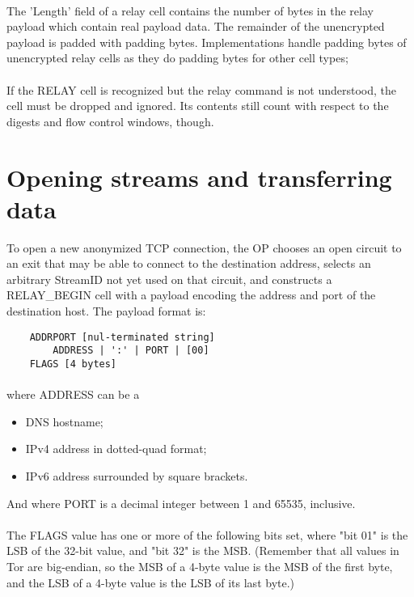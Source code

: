 \paragraph{}
The 'Length' field of a relay cell contains the number of bytes in
the relay payload which contain real payload data. The remainder of
the unencrypted payload is padded with padding bytes. Implementations
handle padding bytes of unencrypted relay cells as they do padding
bytes for other cell types;

\paragraph{}
If the RELAY cell is recognized but the relay command is not
understood, the cell must be dropped and ignored. Its contents
still count with respect to the digests and flow control windows, though.

\section{Opening streams and transferring data}
To open a new anonymized TCP connection, the OP chooses an open
circuit to an exit that may be able to connect to the destination
address, selects an arbitrary StreamID not yet used on that circuit,
and constructs a RELAY\_BEGIN cell with a payload encoding the address
and port of the destination host. The payload format is:

\begin{verbatim}
    ADDRPORT [nul-terminated string]
        ADDRESS | ':' | PORT | [00]
    FLAGS [4 bytes]
\end{verbatim}

\paragraph{}
where ADDRESS can be a
\begin{itemize}
    \item DNS hostname;
    \item IPv4 address in dotted-quad format;
    \item IPv6 address surrounded by square brackets.
\end{itemize}

And where PORT is a decimal integer between 1 and 65535, inclusive.

\paragraph{}
The FLAGS value has one or more of the following bits set, where
"bit 01" is the LSB of the 32-bit value, and "bit 32" is the MSB.
(Remember that all values in Tor are big-endian, so
the MSB of a 4-byte value is the MSB of the first byte, and the LSB
of a 4-byte value is the LSB of its last byte.)

